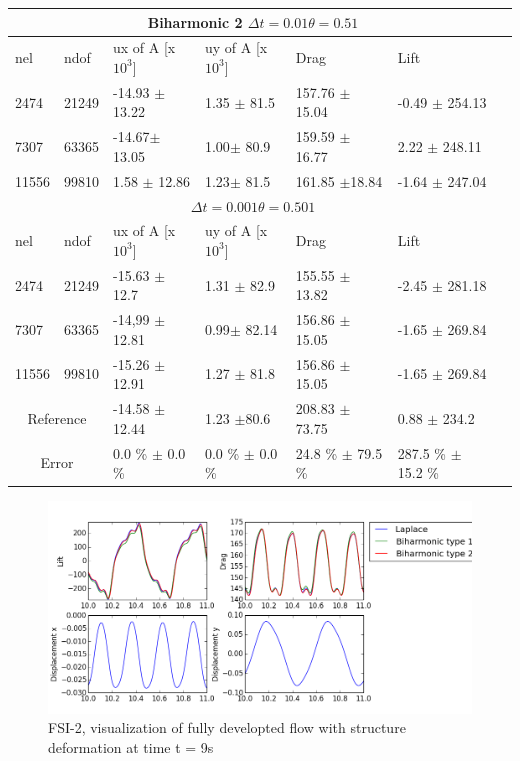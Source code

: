\begin{table}[h!]
\centering
\label{my-label}
\begin{tabular}{ |p{1cm}||p{1cm}|p{2.7cm}|p{2.7cm}|p{2.9cm}|p{3.1cm}|p{1.2cm}|}
 \hline
  \multicolumn{6}{|c|}{Biharmonic 2 \hspace{2mm}  $\Delta t = 0.01 \theta = 0.51$} \\
   \hline
nel & ndof & ux of A [x $10^{3}$]  &uy of A [x $10^{3}$]& Drag  & Lift \\
 \hline
 2474    & 21249  & -14.93 $\pm$ 13.22 & 1.35 $\pm$ 81.5 & 157.76  $\pm$ 15.04 & -0.49  $\pm$  254.13 \\
 7307    & 63365  & -14.67$\pm$ 13.05 & 1.00$\pm$ 80.9& 159.59 $\pm$  16.77 & 2.22 $\pm$  248.11  \\
 11556   & 99810  & 1.58 $\pm$ 12.86 & 1.23$\pm$ 81.5& 161.85   $\pm$18.84 & -1.64  $\pm$  247.04 \\
 \hline
  \multicolumn{6}{|c|}{$\Delta t = 0.001 \theta = 0.501$} \\
   \hline
 nel & ndof & ux of A [x $10^{3}$]  &uy of A [x $10^{3}$]& Drag  & Lift \\
\hline
 2474    & 21249  & -15.63  $\pm$ 12.7 & 1.31 $\pm$ 82.9 & 155.55      $\pm$ 13.82 & -2.45   $\pm$ 281.18 \\
 7307    & 63365  &  -14,99 $\pm$ 12.81& 0.99$\pm$ 82.14& 156.86    $\pm$  15.05 & -1.65   $\pm$ 269.84 \\
 11556   & 99810  &  -15.26 $\pm$ 12.91 & 1.27  $\pm$ 81.8 & 156.86   $\pm$ 15.05 & -1.65 $\pm$ 269.84 \\
 \hline
\multicolumn{2}{|c|}{Reference} & -14.58 $\pm$ 12.44   & 1.23 $\pm$80.6    & 208.83 $\pm$ 73.75 & 0.88 $\pm$ 234.2 \\
 \hline
\multicolumn{2}{|c|}{Error}  & 0.0 \% $\pm$ 0.0 \% & 0.0 \% $\pm$ 0.0 \% & 24.8 \% $\pm$ 79.5 \% & 287.5 \% $\pm$ 15.2 \% \\
 \hline
\end{tabular}
\end{table}

\newpage

\begin{figure}[h!]
  \centering
    \includegraphics[scale=0.64]{./Fig/fsi2compare.png}
      \caption{FSI-2, visualization of fully developted flow with structure deformation at time t = 9s}
\end{figure}

